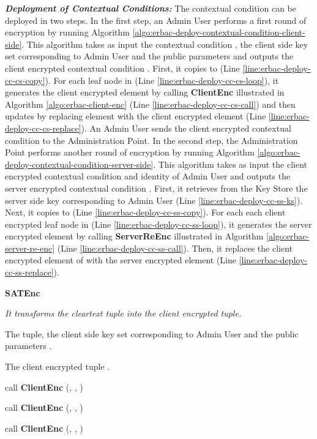 \documentclass[epsfig,a4paper,11pt,titlepage]{book}
\numberwithin{algorithm}{chapter}
\newcommand{\algofontsize}{\fontsize{11}{12}\selectfont}
\begin{document}
\noindent \emph{\textbf{Deployment of Contextual Conditions:}}
The contextual condition can be deployed in two steps. In the first step, an Admin User performs a first round of encryption by running Algorithm \ref{algo:erbac-deploy-contextual-condition-client-side}. This algorithm takes as input the contextual condition , the client side key set  corresponding to Admin User  and the public parameters  and outputs the client encrypted contextual condition . First, it copies  to  (Line \ref{line:erbac-deploy-cc-cs-copy}). For each leaf node in  (Line \ref{line:erbac-deploy-cc-cs-loop}), it generates the client encrypted element by calling \textbf{ClientEnc} illustrated in Algorithm \ref{algo:erbac-client-enc} (Line \ref{line:erbac-deploy-cc-cs-call}) and then updates  by replacing element  with the client encrypted element  (Line \ref{line:erbac-deploy-cc-cs-replace}). An Admin User sends the client encrypted contextual condition to the Administration Point.
In the second step, the Administration Point performs another round of encryption by running Algorithm \ref{algo:erbac-deploy-contextual-condition-server-side}. This algorithm takes as input the client encrypted contextual condition  and identity of Admin User  and outputs the server encrypted contextual condition . First, it retrieves from the Key Store the server side key  corresponding to Admin User  (Line \ref{line:erbac-deploy-cc-ss-ks}). Next, it copies  to  (Line \ref{line:erbac-deploy-cc-ss-copy}). For each each client encrypted leaf node in  (Line \ref{line:erbac-deploy-cc-ss-loop}), it generates the server encrypted element by calling \textbf{ServerReEnc} illustrated in Algorithm \ref{algo:erbac-server-re-enc} (Line \ref{line:erbac-deploy-cc-ss-call}). Then, it replaces the client encrypted element  of  with the server encrypted element  (Line \ref{line:erbac-deploy-cc-ss-replace}).




\begin{algorithm} [htp]
{\algofontsize
\caption{\textbf{SATEnc}}

\label{algo:espoon-deploy-sat-client-side}

\begin{algorithmic}[1]

\INPUT \emph{It transforms the cleartext tuple into the client encrypted tuple.}

\Require The  tuple, the client side key set  corresponding to Admin User  and the public parameters .

\Ensure The client encrypted tuple .

\medskip

\State  call \textbf{ClientEnc} (, , ) \label{line:espoon-deploy-s-client-call}

\State  call \textbf{ClientEnc} (, , ) \label{line:espoon-deploy-a-client-call}

\State  call \textbf{ClientEnc} (, , ) \label{line:espoon-deploy-t-client-call}

\State  \label{line:espoon-deploy-sat-client-assignment}

\Return 

\end{algorithmic}
}
\end{algorithm}
\end{document}
